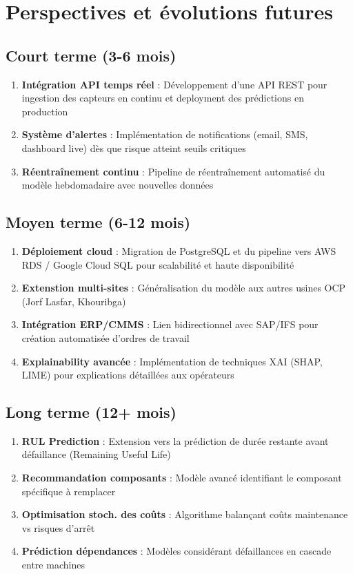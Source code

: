\documentclass[a4paper,12pt,twoside]{report}
\begin{document}
\section{Perspectives et évolutions futures}

\subsection{Court terme (3-6 mois)}

\begin{enumerate}
    \item \textbf{Intégration API temps réel} : Développement d'une API REST pour ingestion des capteurs en continu et deployment des prédictions en production
    \item \textbf{Système d'alertes} : Implémentation de notifications (email, SMS, dashboard live) dès que risque atteint seuils critiques
    \item \textbf{Réentraînement continu} : Pipeline de réentraînement automatisé du modèle hebdomadaire avec nouvelles données
\end{enumerate}

\subsection{Moyen terme (6-12 mois)}

\begin{enumerate}
    \item \textbf{Déploiement cloud} : Migration de PostgreSQL et du pipeline vers AWS RDS / Google Cloud SQL pour scalabilité et haute disponibilité
    \item \textbf{Extenstion multi-sites} : Généralisation du modèle aux autres usines OCP (Jorf Lasfar, Khouribga)
    \item \textbf{Intégration ERP/CMMS} : Lien bidirectionnel avec SAP/IFS pour création automatisée d'ordres de travail
    \item \textbf{Explainability avancée} : Implémentation de techniques XAI (SHAP, LIME) pour explications détaillées aux opérateurs
\end{enumerate}

\subsection{Long terme (12+ mois)}

\begin{enumerate}
    \item \textbf{RUL Prediction} : Extension vers la prédiction de durée restante avant défaillance (Remaining Useful Life)
    \item \textbf{Recommandation composants} : Modèle avancé identifiant le composant spécifique à remplacer
    \item \textbf{Optimisation stoch. des coûts} : Algorithme balançant coûts maintenance vs risques d'arrêt
    \item \textbf{Prédiction dépendances} : Modèles considérant défaillances en cascade entre machines
\end{enumerate}
\end{document}
